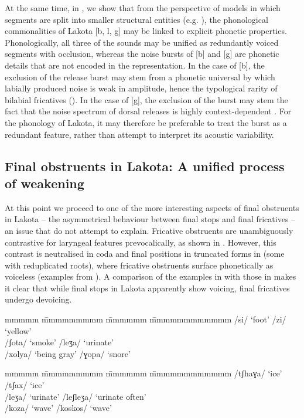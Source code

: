 \documentclass[output=paper]{langscibook}
\begin{document}
At the same time, in , we show that from the perspective of models in which segments are split into smaller structural entities (e.g. \citealt{Steriade1993,Schwartz2016}), the phonological commonalities of Lakota [b, l, g] may be linked to explicit phonetic properties. Phonologically, all three of the sounds may be unified as redundantly voiced segments with occlusion, whereas the noise bursts of [b] and [g] are phonetic details that are not encoded in the representation. In the case of [b], the exclusion of the release burst may stem from a phonetic universal by which labially produced noise is weak in amplitude, hence the typological rarity of bilabial fricatives (\citealt{LadefogedMaddieson1996}). In the case of [g], the exclusion of the burst may stem the fact that the noise spectrum of dorsal releases is highly context-dependent \citep{Stevens1998}. For the phonology of Lakota, it may therefore be preferable to treat the burst as a redundant feature, rather than attempt to interpret its acoustic variability.

\subsection{Final obstruents in Lakota: A unified process of weakening}
\label{sec:schwartz:2.3}

At this point we proceed to one of the more interesting aspects of final obstruents in Lakota – the asymmetrical behaviour between final stops and final fricatives – an issue that \citet{BlevinsEtAl2020} do not attempt to explain. Fricative obstruents are unambiguously contrastive for laryngeal features prevocalically, as shown in . However, this contrast is neutralised in coda and final positions in truncated forms in  (some with reduplicated roots), where fricative obstruents surface phonetically as voiceless (examples from \citealt[300]{BlevinsEtAl2020}). A comparison of the examples in  with those in  makes it clear that while final stops in Lakota apparently show voicing, final fricatives undergo devoicing.

\ea
\label{ex:schwartz:5}
  \begin{tabbing}
  mmmmm   \= mmmmmmmmm    \=   mmmmmm \=  mmmmmmmmmmmm\kill
  /si/    \> ‘foot’       \>   /zi/   \> ‘yellow’\\
  /ʃota/  \> ‘smoke’      \>   /leʒa/ \>   ‘urinate’\\
  /xolya/ \> ‘being gray’ \>   /ɣopa/ \>   ‘snore’
  \end{tabbing}
\ex
\label{ex:schwartz:6}
  \begin{tabbing}
  mmmmm   \= mmmmmmmmm    \=   mmmmmm \=  mmmmmmmmmmmm\kill
  /tʃhaɣa/ \> ‘ice’      \>  /tʃax/    \> ‘ice’\\
  /leʒa/   \> ‘urinate’  \>  /leʃleʒa/ \> ‘urinate often’\\
  /koza/   \> ‘wave’     \>  /koskos/  \> ‘wave’
  \end{tabbing}
\z
\end{document}
